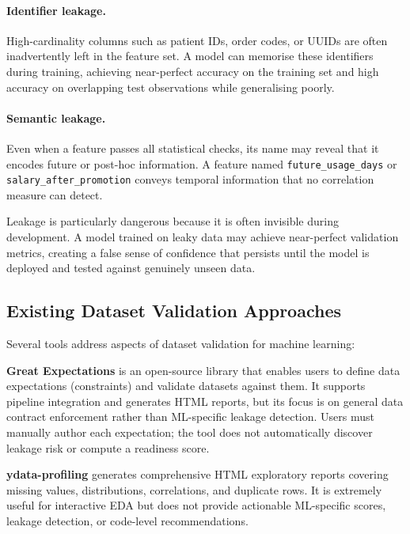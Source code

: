 \documentclass[12pt,a4paper]{report}
\begin{document}
\paragraph{Identifier leakage.} High-cardinality columns such as patient IDs, order codes,
or UUIDs are often inadvertently left in the feature set.  A model can memorise these
identifiers during training, achieving near-perfect accuracy on the training set and high
accuracy on overlapping test observations while generalising poorly.

\paragraph{Semantic leakage.} Even when a feature passes all statistical checks, its name
may reveal that it encodes future or post-hoc information.  A feature named
\texttt{future\_usage\_days} or \texttt{salary\_after\_promotion} conveys temporal
information that no correlation measure can detect.

Leakage is particularly dangerous because it is often invisible during development.  A model
trained on leaky data may achieve near-perfect validation metrics, creating a false sense of
confidence that persists until the model is deployed and tested against genuinely unseen data.

\subsection{Existing Dataset Validation Approaches}
\label{sec:tool_comparison}

Several tools address aspects of dataset validation for machine learning:

\textbf{Great Expectations} \cite{greatexpectations} is an open-source library that enables
users to define data expectations (constraints) and validate datasets against them.  It
supports pipeline integration and generates HTML reports, but its focus is on general data
contract enforcement rather than ML-specific leakage detection.  Users must manually author
each expectation; the tool does not automatically discover leakage risk or compute a
readiness score.

\textbf{ydata-profiling} \cite{ydataprofiling} generates comprehensive HTML exploratory
reports covering missing values, distributions, correlations, and duplicate rows.  It is
extremely useful for interactive EDA but does not provide actionable ML-specific scores,
leakage detection, or code-level recommendations.
\end{document}
